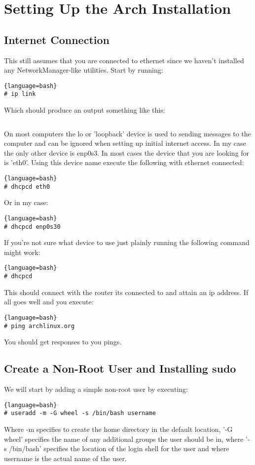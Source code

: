 
\section{Setting Up the Arch Installation}
\subsection{Internet Connection}
\label{sec:Internet_Connection}
This still assumes that you are connected to ethernet since we haven't installed any NetworkManager-like utilities.
Start by running:
\begin{lstlisting}{language=bash}
# ip link 
\end{lstlisting}
Which should produce an output something like this:
\inputminted[linenos, fontsize=\small, baselinestretch=0.875, frame=lines]{shell}{Sections/6/iplink.txt}
On most computers the lo or 'loopback' device is used to sending messages to the computer and can be ignored when setting up initial internet access. In my case the only other device is enp0s3. In most cases the device that you are looking for is 'eth0'. Using this device name execute the following with ethernet connected:
\begin{lstlisting}{language=bash}
# dhcpcd eth0
\end{lstlisting}
Or in my case:
\begin{lstlisting}{language=bash}
# dhcpcd enp0s30
\end{lstlisting}
If you're not sure what device to use just plainly running the following command might work:
\begin{lstlisting}{language=bash}
# dhcpcd
\end{lstlisting}
This should connect with the router its connected to and attain an ip address. If all goes well and you execute:
\begin{lstlisting}{language=bash}
# ping archlinux.org
\end{lstlisting}
You should get responses to you pings.

\subsection{Create a Non-Root User and Installing sudo}
We will start by adding a simple non-root user by executing:
\begin{lstlisting}{language=bash}
# useradd -m -G wheel -s /bin/bash username
\end{lstlisting}
Where -m specifies to create the home directory in the default location, '-G wheel' specifies the name of any additional groups the user should be in, where '-s /bin/bash' specifies the location of the login shell for the user and where username is the actual name of the user.

